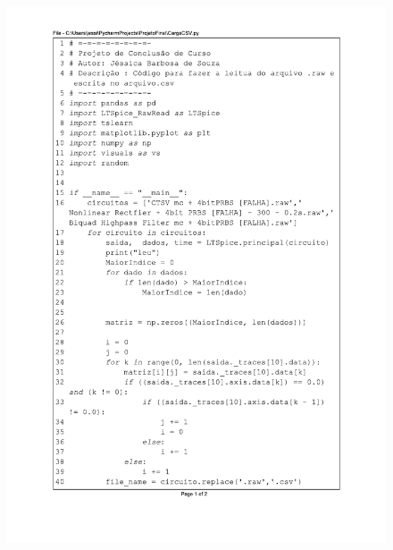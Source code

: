 \begin{figure}[H]
\centering
\includegraphics[scale=0.75]{01_Pre_textuais/code/CargaCsv.pdf}
\end{figure}

\newpage

